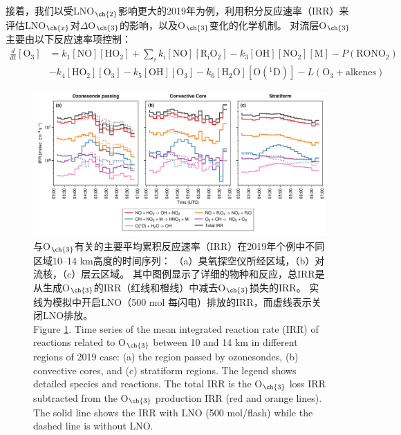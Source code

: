 接着，我们以受LNO$_{\ch{2}}$影响更大的2019年为例，利用积分反应速率（IRR）来评估LNO$_{\ch{x}}$对$\Delta$O$_{\ch{3}}$的影响，以及O$_{\ch{3}}$变化的化学机制。
对流层O$_{\ch{3}}$主要由以下反应速率项控制\citep{Mazzuca.2016}：
{
\abovedisplayskip=3pt%
\belowdisplayskip=3pt%
\begingroup
\allowdisplaybreaks
\begin{align}
  \frac{d}{dt}[\mathrm{O_3}] &= k_1[\mathrm{NO}][\mathrm{HO_2}] + \sum_{i}  k_i[\mathrm{NO}][\mathrm{R_iO_2}] - k_3[\mathrm{OH}][\mathrm{NO_2}][\mathrm{M}] - P(\mathrm{RONO_2}) \nonumber \\
                             & - k_4[\mathrm{HO_2}][\mathrm{O_3}] - k_5[\mathrm{OH}][\mathrm{O_3}] - k_6[\mathrm{H_2O}][\mathrm{O(^1D)}] - L(\mathrm{O_3+alkenes})
\end{align}
\endgroup
}


\begin{figure}[H]
\centering
\includegraphics[width=\textwidth]{./figures/irr_timeseries.png}
\caption{
与O$_{\ch{3}}$有关的主要平均累积反应速率（IRR）在2019年个例中不同区域10--14 km高度的时间序列：
（a）臭氧探空仪所经区域，（b）对流核，（c）层云区域。
其中图例显示了详细的物种和反应，总IRR是从生成O$_{\ch{3}}$的IRR（红线和橙线）中减去O$_{\ch{3}}$损失的IRR。
实线为模拟中开启LNO（500 mol 每闪电）排放的IRR，而虚线表示关闭LNO排放。\\
Figure \ref{fig:irr_timeseries}. Time series of the mean integrated reaction rate (IRR) of reactions related to O$_{\ch{3}}$ between 10 and 14 km in different regions of 2019 case: (a) the region passed by ozonesondes, (b) convective cores, and (c) stratiform regions.
The legend shows detailed species and reactions.
The total IRR is the O$_{\ch{3}}$ loss IRR subtracted from the O$_{\ch{3}}$ production IRR (red and orange lines).
The solid line shows the IRR with LNO (500 mol/flash) while the dashed line is without LNO.
}
\label{fig:irr_timeseries}
\end{figure}


